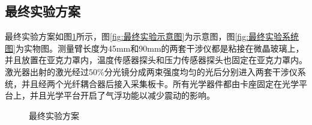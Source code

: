 \subsection{最终实验方案}
最终实验方案如图\ref{fig:最终实验方案}所示，图\ref{fig:最终实验示意图}为示意图，图\ref{fig:最终实验系统图}为实物图。测量臂长度为45mm和90mm的两套干涉仪都是粘接在微晶玻璃上，并且放置在亚克力罩内，温度传感器探头和压力传感器探头也固定在亚克力罩内。激光器出射的激光经过$50\%$分光镜分成两束强度均匀的光后分别进入两套干涉仪系统，并且经两个光纤耦合器后接入采集板卡。所有光学器件都由卡座固定在光学平台上，并且光学平台开启了气浮功能以减少震动的影响。
\begin{figure}[htb]
    \centering
    \caption{最终实验方案}
    \label{fig:最终实验方案}
  \end{figure}

